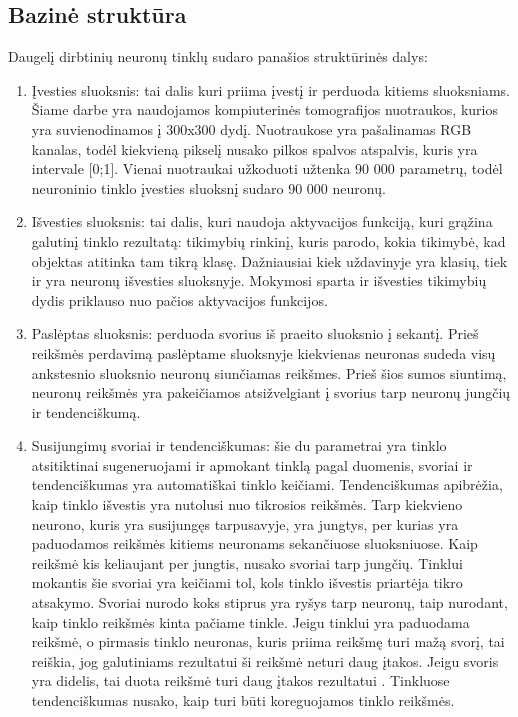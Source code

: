 \documentclass{VUMIFInfKursinis}
\begin{document}
\subsection{Bazinė struktūra}
Daugelį dirbtinių neuronų tinklų sudaro panašios struktūrinės dalys:
\begin{enumerate}
  \item Įvesties sluoksnis: tai dalis kuri priima įvestį ir perduoda kitiems sluoksniams.
  Šiame darbe yra naudojamos kompiuterinės tomografijos nuotraukos, kurios yra suvienodinamos
  į 300x300 dydį. Nuotraukose yra pašalinamas RGB kanalas, todėl kiekvieną pikselį nusako
  pilkos spalvos atspalvis, kuris yra intervale [0;1]. Vienai nuotraukai užkoduoti
  užtenka 90 000 parametrų, todėl neuroninio tinklo įvesties sluoksnį sudaro 90 000 neuronų.
  \item Išvesties sluoksnis: tai dalis, kuri naudoja aktyvacijos funkciją, kuri grąžina galutinį tinklo rezultatą: tikimybių rinkinį,
  kuris parodo, kokia tikimybė, kad objektas atitinka tam tikrą klasę. Dažniausiai kiek
  uždavinyje yra klasių, tiek ir yra neuronų išvesties sluoksnyje.
  Mokymosi sparta ir išvesties tikimybių dydis priklauso nuo pačios aktyvacijos funkcijos. 
  \item Paslėptas sluoksnis: perduoda svorius iš praeito sluoksnio į sekantį. Prieš reikšmės perdavimą paslėptame
  sluoksnyje kiekvienas neuronas sudeda visų ankstesnio sluoksnio neuronų siunčiamas reikšmes. Prieš šios sumos siuntimą,
  neuronų reikšmės yra pakeičiamos atsižvelgiant į svorius tarp neuronų jungčių ir
  tendenciškumą.
  \item Susijungimų svoriai ir tendenciškumas: šie du parametrai yra
  tinklo atsitiktinai sugeneruojami ir apmokant tinklą pagal
  duomenis, svoriai ir tendenciškumas
  yra automatiškai tinklo keičiami. Tendenciškumas apibrėžia, kaip tinklo išvestis yra nutolusi
  nuo tikrosios reikšmės. Tarp
  kiekvieno neurono, kuris yra susijungęs tarpusavyje, yra jungtys, per
  kurias yra paduodamos reikšmės kitiems neuronams sekančiuose sluoksniuose.
  Kaip reikšmė kis keliaujant per jungtis, nusako svoriai tarp jungčių. Tinklui mokantis
  šie svoriai yra keičiami tol, kols tinklo išvestis priartėja tikro atsakymo. Svoriai
  nurodo koks stiprus yra ryšys tarp neuronų, taip nurodant, kaip tinklo reikšmės kinta pačiame tinkle.
  Jeigu tinklui yra paduodama reikšmė, o pirmasis tinklo neuronas, kuris priima reikšmę turi mažą
  svorį, tai reiškia, jog galutiniams rezultatui ši reikšmė neturi daug įtakos. Jeigu svoris yra
  didelis, tai duota reikšmė turi daug įtakos rezultatui \cite{salt2}. Tinkluose tendenciškumas nusako, kaip turi būti koreguojamos tinklo reikšmės.

\end{enumerate}
\end{document}
